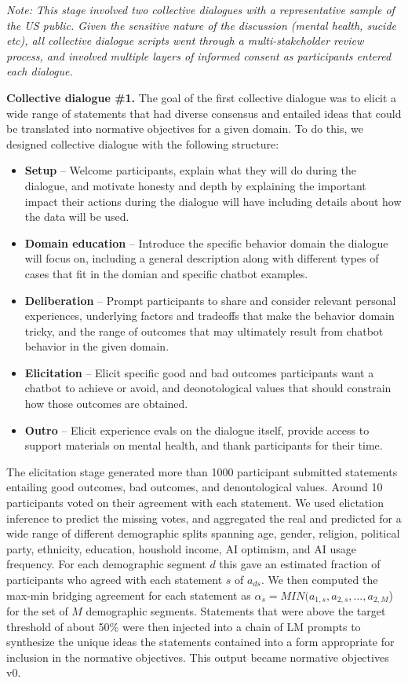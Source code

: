 \documentclass{article}
\begin{document}
\emph{Note: This stage involved two collective dialogues with a representative sample of the US public. Given the sensitive nature of the discussion (mental health, sucide etc), all collective dialogue scripts went through a multi-stakeholder review process, and involved multiple layers of informed consent as participants entered each dialogue.}

\textbf{Collective dialogue \#1.} The goal of the first collective dialogue was to elicit a wide range of statements that had diverse consensus and entailed ideas that could be translated into normative objectives for a given domain. To do this, we designed collective dialogue with the following structure:
\begin{itemize}
    \item \textbf{Setup} -- Welcome participants, explain what they will do during the dialogue, and motivate honesty and depth by explaining the important impact their actions during the dialogue will have including details about how the data will be used.
    \item \textbf{Domain education} -- Introduce the specific behavior domain the dialogue will focus on, including a general description along with different types of cases that fit in the domian and specific chatbot examples.  
    \item \textbf{Deliberation} -- Prompt participants to share and consider relevant personal experiences, underlying factors and tradeoffs that make the behavior domain tricky, and the range of outcomes that may ultimately result from chatbot behavior in the given domain.
    \item \textbf{Elicitation} -- Elicit specific good and bad outcomes participants want a chatbot to achieve or avoid, and deonotological values that should constrain how those outcomes are obtained. 
    \item \textbf{Outro} -- Elicit experience evals on the dialogue itself, provide access to support materials on mental health, and thank participants for their time.
\end{itemize}

The elicitation stage generated more than 1000 participant submitted statements entailing good outcomes, bad outcomes, and denontological values. Around 10 participants voted on their agreement with each statement. We used elictation inference \cite{konya2022elicitation} to predict the missing votes, and aggregated the real and predicted for a wide range of different demographic splits spanning age, gender, religion, political party, ethnicity, education, houshold income, AI optimism, and AI usage frequency. For each demographic segment $d$ this gave an estimated fraction of participants who agreed with each statement $s$ of $a_{ds}$. We then computed the max-min bridging agreement for each statement as $\alpha_s = MIN(a_{1,s},a_{2,s},..., a_{2,M}$) for the set of $M$ demographic segments. Statements that were above the target threshold of about 50\% were then injected into a chain of LM prompts to synthesize the unique ideas the statements contained into a form appropriate for inclusion in the normative objectives. This output became normative objectives v0. 
\end{document}
